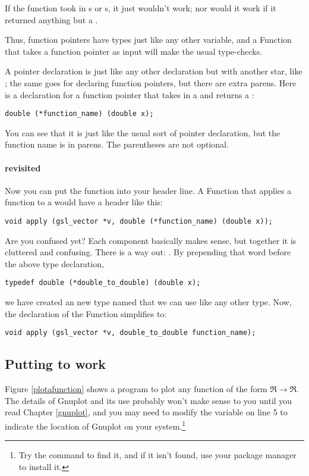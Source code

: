 If the function took in s or s, it just
wouldn't work; nor would it work if it returned anything but a
.

Thus, function pointers have types just like any other variable, and a
Function that takes a function pointer as input will make the usual
type-checks.

A pointer declaration is just like any other declaration but with
another star, like ; the same goes for declaring function
pointers, but there are extra parens. Here is a declaration for a
function pointer that takes in a  and returns a :
\begin{lstlisting}
double (*function_name) (double x);
\end{lstlisting}
You can see that it is just like the usual  sort of pointer
declaration, but the function name is in parens.  The parentheses are not
optional.

\paragraph{ revisited}
Now you can put the function into your header line. A Function that
applies a function to a  would have a header like
this:
\begin{lstlisting}
void apply (gsl_vector *v, double (*function_name) (double x));
\end{lstlisting}

Are you confused yet? Each component basically makes sense, but together
it is cluttered and confusing. There is a way out: . By prepending
that word before the above type declaration,
\begin{lstlisting}
typedef double (*double_to_double) (double x);
\end{lstlisting}
we have created an new type named  that we can
use like any other type. Now, the declaration of the  Function
simplifies to:
\begin{lstlisting}[emph={double_to_double,gsl_vector}]
void apply (gsl_vector *v, double_to_double function_name);
\end{lstlisting}

\subsection{Putting  to work}
Figure \ref{plotafunction} shows a program to plot any function of the
form $\Re\to\Re$. The
details of Gnuplot and its use probably won't make sense to you until
you read Chapter \ref{gnuplot}, and you may need to modify the
 variable on line 5 to indicate the location of Gnuplot on
your system.\footnote{Try the command  to find it,
and if it isn't found, use your package manager to install it.}

